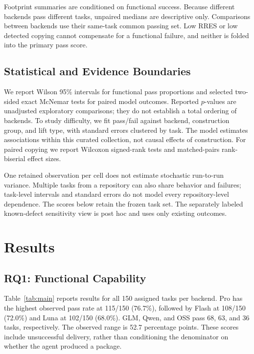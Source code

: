 \documentclass[acmsmall,screen,review,anonymous]{acmart}
\begin{document}
Footprint summaries are conditioned on functional success. Because different
backends pass different tasks, unpaired medians are descriptive only. Comparisons
between backends use their same-task common passing set. Low RRES or low detected
copying cannot compensate for a functional failure, and neither is folded into
the primary pass score.

\subsection{Statistical and Evidence Boundaries}

We report Wilson 95\% intervals for functional pass proportions and selected
two-sided exact McNemar tests for paired model outcomes. Reported $p$-values are
unadjusted exploratory comparisons; they do not establish a total ordering of
backends. To study difficulty, we fit pass/fail against backend, construction
group, and lift type, with standard errors clustered by task. The model estimates
associations within this curated collection, not causal effects of construction.
For paired copying we report Wilcoxon signed-rank tests and matched-pairs
rank-biserial effect sizes.

One retained observation per cell does not estimate stochastic run-to-run
variance. Multiple tasks from a repository can also share behavior and failures;
task-level intervals and standard errors do not model every repository-level
dependence. The scores below retain the frozen task set. The separately labeled
known-defect sensitivity view is post hoc and uses only existing outcomes.

\section{Results}
\label{sec:results}

\subsection{RQ1: Functional Capability}
\label{sec:rq1}

Table~\ref{tab:main} reports results for all 150 assigned tasks per backend.
Pro has the highest observed pass rate at 115/150 (76.7\%), followed by Flash
at 108/150 (72.0\%) and Luna at 102/150 (68.0\%). GLM, Qwen, and OSS pass
68, 63, and 36 tasks, respectively. The observed range is 52.7 percentage
points. These scores include unsuccessful delivery, rather than conditioning
the denominator on whether the agent produced a package.
\end{document}
